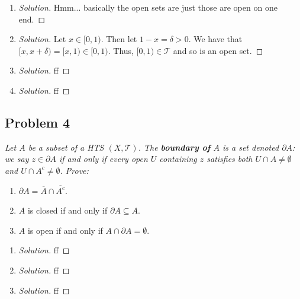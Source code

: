 \documentclass{article}
\begin{document}
\begin{enumerate}
	\item \begin{proof}[Solution]\let\qed\relax
		Hmm... basically the open sets are just those are open on one end.
	\end{proof}
	\item \begin{proof}[Solution]\let\qed\relax
		Let $x \in [0,1)$.
		Then let $1 - x = \delta > 0$.
		We have that $[x, x + \delta) = [x,1) \in [0,1)$.
		Thus, $[0,1) \in \mathcal{T}$ and so is an open set.
	\end{proof}
	\item \begin{proof}[Solution]\let\qed\relax
		ff
	\end{proof}
	\item \begin{proof}[Solution]\let\qed\relax
		ff
	\end{proof}
\end{enumerate}
\clearpage

\subsection*{Problem 4}
{\it Let $A$ be a subset of a HTS $(X,\mathcal{T})$.
The \textbf{boundary of} $A$ is a set denoted $\partial A$:
we say $z \in \partial A$ if and only if every open $U$ containing $z$
satisfies both $U \cap A \neq \emptyset$ and $U \cap A^c \neq \emptyset$. Prove:}
\begin{enumerate}
	\item $\partial A = \overline{A} \cap \overline{A^c}$.
	\item $A$ is closed if and only if $\partial A \subseteq A$.
	\item $A$ is open if and only if $A \cap \partial A = \emptyset$.
\end{enumerate}

\begin{enumerate}
	\item \begin{proof}[Solution]\let\qed\relax
		ff
	\end{proof}
	\item \begin{proof}[Solution]\let\qed\relax
		ff
	\end{proof}
	\item \begin{proof}[Solution]\let\qed\relax
		ff
	\end{proof}
\end{enumerate}
\clearpage
~\clearpage
\end{document}
